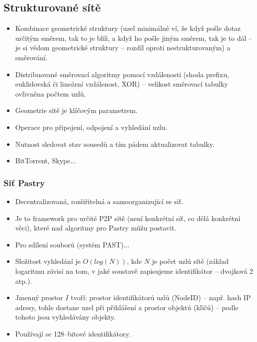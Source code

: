 \documentclass[11pt,a4paper]{article}
\begin{document}
\subsection{Strukturované sítě}
\begin{itemize}
\item Kombinace geometrické struktury (uzel minimálně ví, že když pošle dotaz určitým směrem, tak to je blíž, a když ho pošle jiným směrem, tak je to dál -- je si vědom geometrické struktury -- rozdíl oproti nestrukturovaným) a směrování.
\item Distribuované směrovací algoritmy pomocí vzdálenosti (shoda prefixu, euklidovská či lineární vzdálenost, XOR) -- velikost směrovací tabulky ovlivněna počtem uzlů.
\item Geometrie sítě je klíčovým parametrem.
\item Operace pro připojení, odpojení a vyhledání uzlu.
\item Nutnost sledovat stav sousedů a tím pádem aktualizovat tabulky.
\item BitTorrent, Skype$\ldots$
\end{itemize}

\subsubsection{Síť Pastry}
\begin{itemize}
\item Decentralizovaná, rozšiřitelná a samoorganizující se síť.
\item Je to framework pro určité P2P sítě (není konkrétní síť, co dělá konkrétní věci), které nad algoritmy pro Pastry můžu postavit. 
\item Pro sdílení souborů (systém PAST)$\ldots$
\item Složitost vyhledání je $O(log(N))$, kde $N$ je počet uzlů sítě (základ logaritmu závisí na tom, v jaké soustavě zapisujeme identifikátor -- dvojková 2 atp.).
\item Jmenný prostor $I$ tvoří: prostor identifikátorů uzlů (NodeID) -- např. hash IP adresy, tohle dostane uzel při přihlášení a prostor objektů (klíčů) -- podle tohoto jsou vyhledávány objekty.
\item Používají se 128--bitové identifikátory.
\end{itemize}
\end{document}
